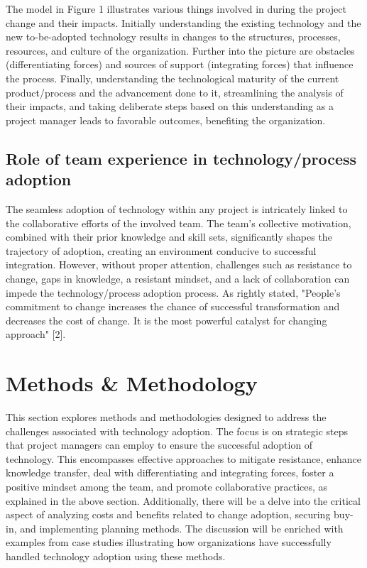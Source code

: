 \documentclass{article}
\begin{document}
\noindent The model in Figure 1 illustrates various things involved in during the project change and their impacts. Initially understanding the existing technology and the new to-be-adopted technology results in changes to the structures, processes, resources, and culture of the organization. Further into the picture are obstacles (differentiating forces) and sources of support (integrating forces) that influence the process. Finally, understanding the technological maturity of the current product/process and the advancement done to it, streamlining the analysis of their impacts, and taking deliberate steps based on this understanding as a project manager leads to favorable outcomes, benefiting the organization.

\subsection{Role of team experience in technology/process adoption}

The seamless adoption of technology within any project is intricately linked to the collaborative efforts of the involved team. The team's collective motivation, combined with their prior knowledge and skill sets, significantly shapes the trajectory of adoption, creating an environment conducive to successful integration. However, without proper attention, challenges such as resistance to change, gaps in knowledge, a resistant mindset, and a lack of collaboration can impede the technology/process adoption process. As rightly stated, "People's commitment to change increases the chance of successful transformation and decreases the cost of change. It is the most powerful catalyst for changing approach" [2].


\section{Methods \& Methodology}
This section explores methods and methodologies designed to address the challenges associated with technology adoption. The focus is on strategic steps that project managers can employ to ensure the successful adoption of technology. This encompasses effective approaches to mitigate resistance, enhance knowledge transfer, deal with differentiating and integrating forces, foster a positive mindset among the team, and promote collaborative practices, as explained in the above section. Additionally, there will be a delve into the critical aspect of analyzing costs and benefits related to change adoption, securing buy-in, and implementing planning methods. The discussion will be enriched with examples from case studies illustrating how organizations have successfully handled technology adoption using these methods.
\end{document}
